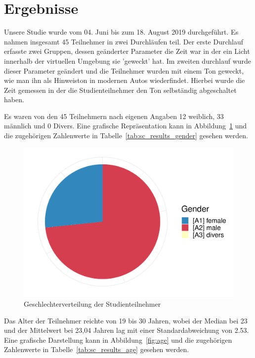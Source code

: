 \section{Ergebnisse}


Unsere Studie wurde vom 04. Juni bis zum 18. August 2019 durchgeführt. Es nahmen insgesamt 45 Teilnehmer in zwei Durchläufen teil. Der erste Durchlauf erfasste zwei Gruppen, dessen geänderter Parameter die Zeit war in der ein Licht innerhalb der virtuellen Umgebung sie 'geweckt' hat. Im zweiten durchlauf wurde dieser Parameter geändert und die Teilnehmer wurden mit einem Ton geweckt, wie man ihn als Hinweiston in modernen Autos wiederfindet. Hierbei wurde die Zeit gemessen in der die Studienteilnehmer den Ton selbständig abgeschaltet haben. 

Es waren von den 45 Teilnehmern nach eigenen Angaben 12 weiblich, 33 männlich und 0 Divers. Eine grafische Repräsentation kann in Abbildung~\ref{fig:gender} und die zugehörigen Zahlenwerte in Tabelle~\ref{tab:sc_results_gender} gesehen werden. 

\begin{figure}
	\includegraphics[width=\textwidth]{./appendices/gender}
	\caption{Geschlechterverteilung der Studienteilnehmer}
	\label{fig:gender}
\end{figure}

Das Alter der Teilnehmer reichte von 19 bis 30 Jahren, wobei der Median bei 23 und der Mittelwert bei 23,04 Jahren lag mit einer Standardabweichung von 2.53. Eine grafische Darstellung kann in Abbildung~\ref{fig:age} und die zugehörigen Zahlenwerte in Tabelle~\ref{tab:sc_results_age} gesehen werden.

